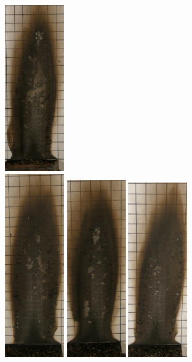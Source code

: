 \documentclass[twoside]{uocthesis}
\begin{document}
{\begin{figure}[p]
	\includegraphics[width=1.0in]{../Figures/GBNG18_P5130386} \\

	\includegraphics[width=1.0in]{../Figures/GBNG19_P5130390}
	\includegraphics[width=1.0in]{../Figures/GBNG20_P5130392}
	\includegraphics[width=1.0in]{../Figures/GBNG21_P5130398}

\end{figure}}
\end{document}
